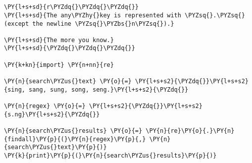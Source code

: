 

\section*{}

\begin{Verbatim}[commandchars=\\\{\}]
\PY{l+s+sd}{r\PYZdq{}\PYZdq{}\PYZdq{}}
\PY{l+s+sd}{The any\PYZhy{}key is represented with \PYZsq{}.\PYZsq{} (except the newline \PYZsq{}\PYZbs{}n\PYZsq{}).}

\PY{l+s+sd}{The more you know.}
\PY{l+s+sd}{\PYZdq{}\PYZdq{}\PYZdq{}}

\PY{k+kn}{import} \PY{n+nn}{re}

\PY{n}{search\PYZus{}text} \PY{o}{=} \PY{l+s+s2}{\PYZdq{}}\PY{l+s+s2}{sing, sang, sung, song, seng.}\PY{l+s+s2}{\PYZdq{}}

\PY{n}{regex} \PY{o}{=} \PY{l+s+s2}{\PYZdq{}}\PY{l+s+s2}{s.ng}\PY{l+s+s2}{\PYZdq{}}

\PY{n}{search\PYZus{}results} \PY{o}{=} \PY{n}{re}\PY{o}{.}\PY{n}{findall}\PY{p}{(}\PY{n}{regex}\PY{p}{,} \PY{n}{search\PYZus{}text}\PY{p}{)}
\PY{k}{print}\PY{p}{(}\PY{n}{search\PYZus{}results}\PY{p}{)}
\end{Verbatim}
